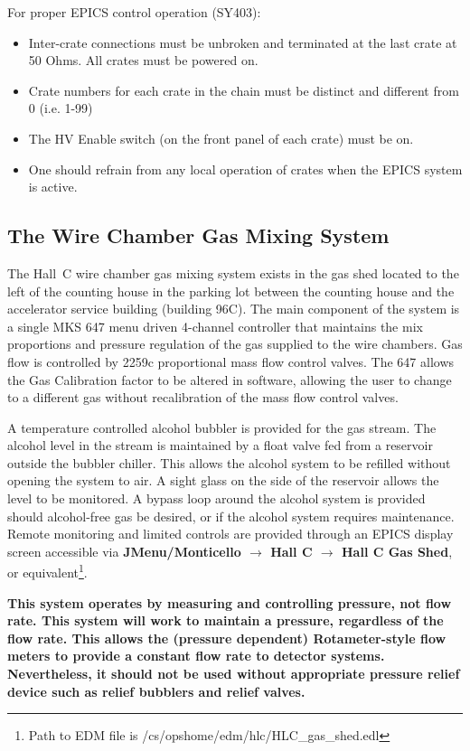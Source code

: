 For proper EPICS control operation (SY403):

\begin{itemize}
\item{Inter-crate connections must be unbroken and terminated at the
last crate at 50 Ohms.  All crates must be powered on.}
\item{Crate numbers for each crate in the chain must be distinct and
different from 0 (i.e. 1-99)}
\item{The HV Enable switch (on the front panel of each crate) must be on.}
\item{One should refrain from any local operation of crates when the
EPICS system is active.}
\end{itemize}

\subsection{The Wire Chamber Gas Mixing System}
\label{sec:chambergas}

The Hall~C wire chamber gas mixing system exists in the gas shed located
to the left of the counting house in the parking lot between the counting house
and the accelerator service building (building 96C).  The main
component of the system is a single MKS 647 menu driven 4-channel
controller that maintains the mix proportions and pressure regulation of the
gas supplied to the wire chambers.  Gas flow is
controlled by 2259c proportional mass flow control valves.  The 647 allows
the Gas Calibration factor to be altered in software, allowing the user to
change to a different gas without recalibration of the mass flow control
valves.

A temperature controlled alcohol bubbler is provided for the gas
stream.  The alcohol level in the stream is maintained by a float valve
fed from a reservoir outside the bubbler chiller. This allows the alcohol
system to be refilled without opening the system to air.  A sight glass on
the side of the reservoir allows the level to be monitored.  A bypass loop
around the alcohol system is provided should alcohol-free gas be desired,
or if the alcohol system requires maintenance.  Remote monitoring and limited
controls are provided through an EPICS display screen accessible via
\textbf{JMenu/Monticello $\rightarrow$ Hall C $\rightarrow$ Hall C Gas Shed},
or equivalent\footnote{Path to EDM file is /cs/opshome/edm/hlc/HLC\_gas\_shed.edl}.

{\bf This system operates by measuring and controlling pressure, not flow rate.
This system will work to maintain a pressure, regardless of the flow rate.
This allows the (pressure dependent) Rotameter-style flow meters to provide
a constant flow rate to detector systems.  Nevertheless, it should not be used
without appropriate pressure relief device such as relief bubblers and relief
valves.}

